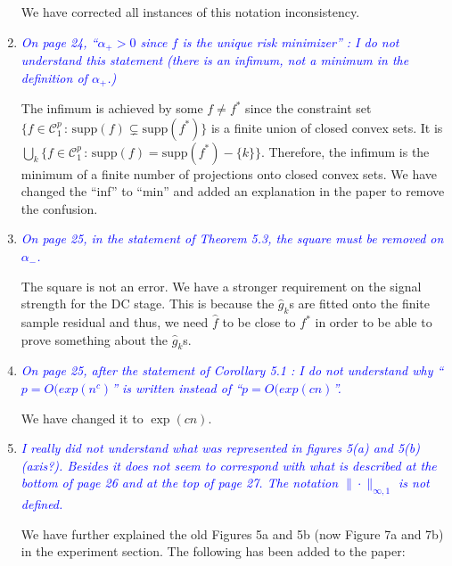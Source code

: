 \documentclass[pdftex,12pt]{article}
\let\hat\widehat
\def\rc#1{{\it\textcolor{blue}{#1}}\smallskip}
\begin{document}
\begin{enumerate}
We have corrected all instances of this notation inconsistency.


\item \rc{On page 24, ``$\alpha_{+} > 0$ since $f$ is the unique risk minimizer'' : I do
not understand this statement (there is an infimum, not a minimum in
the definition of $\alpha_{+}$.)}

The infimum is achieved by some $f \neq f^*$ since the constraint set
$\{ f \in \mathcal{C}^p_1 \,:\, \textrm{supp}(f) \subsetneq
\textrm{supp}(f^*)\}$ is a finite union of closed convex sets. It is
$\bigcup_k \{ f \in \mathcal{C}^p_1 \,:\, \textrm{supp}(f) =
\textrm{supp}(f^*) - \{k\}\}$. Therefore, the infimum is the minimum
of a finite number of projections onto closed convex sets. We have
changed the ``inf'' to ``min'' and added an explanation in the paper
to remove the confusion.


\item \rc{On page 25, in the statement of Theorem 5.3, the square must be
removed on $\alpha_-$.}

The square is not an error. We have a stronger requirement on the
signal strength for the DC stage. This is because the $\hat{g}_k$s
are fitted onto the finite sample residual and thus, we need $\hat{f}$
to be close to $f^*$ in order to be able to prove something about the
$\hat{g}_k$s.

\item \rc{On page 25, after the statement of Corollary 5.1 : I do not understand
why ``$p = O(exp(n^c)$'' is written instead of ``$p = O(exp(cn)$''.}

We have changed it to $\exp(cn)$.


\item \rc{I really did not understand what was represented in figures 5(a) and
5(b) (axis?). Besides it does not seem to correspond with what is
described at the bottom of page 26 and at the top of page 27. The
notation $\|\cdot\|_{\infty,1}$ is not defined.}

We have further explained the old Figures 5a and 5b (now Figure 7a and
7b) in the experiment section. The following has been added to the
paper:


\end{enumerate}
\end{document}
